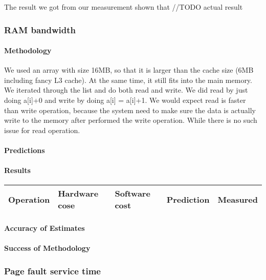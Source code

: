 The result we got from our measurement shown that //TODO actual result






\subsubsection{RAM bandwidth}
\paragraph{Methodology}

We used an array with size 16MB, so that it is larger than the cache size (6MB including fancy L3 cache). At the same time, it still fits into the main memory. We iterated through the list and do both read and write. We did read by just doing a[i]+0 and write by doing a[i] = a[i]+1. We would expect read is faster than write operation, because the system need to make sure the data is actually write to the memory after performed the write operation. While there is no such issue for read operation.
\paragraph{Predictions}
\paragraph{Results}

\begin{center}
\begin{tabular}{| l | l | l | l | l |}
\hline
Operation & Hardware cose & Software cost & Prediction & Measured \\
\hline
\end{tabular}
\end{center}

\paragraph{Accuracy of Estimates}
\paragraph{Success of Methodology}





\subsubsection{Page fault service time}
